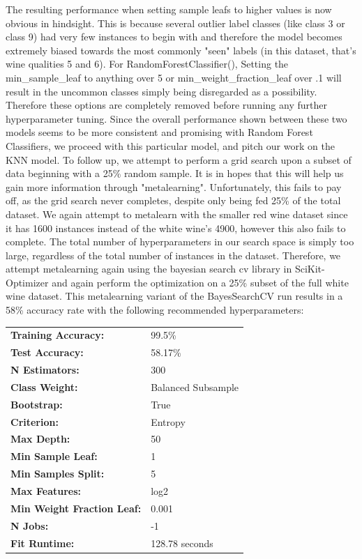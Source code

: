 \documentclass[titlepage]{article}
\begin{document}
The resulting performance when setting sample leafs to higher values is now obvious in hindsight.  This is because several outlier label classes (like class 3 or class 9) had very few instances to begin with and therefore the model becomes extremely biased towards the most commonly "seen" labels (in this dataset, that's wine qualities 5 and 6).  For RandomForestClassifier(), Setting the min\_sample\_leaf to anything over 5 or min\_weight\_fraction\_leaf over .1 will result in the uncommon classes simply being disregarded as a possibility.  Therefore these options are completely removed before running any further hyperparameter tuning.  Since the overall performance shown between these two models seems to be more consistent and promising with Random Forest Classifiers, we proceed with this particular model, and pitch our work on the KNN model.
\vspace{.2cm}\newline
To follow up, we attempt to perform a grid search upon a subset of data beginning with a 25\% random sample.  It is in hopes that this will help us gain more information through "metalearning".  Unfortunately, this fails to pay off, as the grid search never completes, despite only being fed 25\% of the total dataset.  We again attempt to metalearn with the smaller red wine dataset since it has 1600 instances instead of the white wine's 4900, however this also fails to complete.  The total number of hyperparameters in our search space is simply too large, regardless of the total number of instances in the dataset.  Therefore, we attempt metalearning again using the bayesian search cv library in SciKit-Optimizer \cite{skopt} and again perform the optimization on a 25\% subset of the full white wine dataset.  This metalearning variant of the BayesSearchCV run results in a 58\% accuracy rate with the following recommended hyperparameters:  
\vspace{.2cm}\newline
	\begin{tabular}{ l | l  }
	\textbf{Training Accuracy:} &99.5\% \\
	\textbf{Test Accuracy:} & 58.17\% \\
	\textbf{N Estimators:} &  300  \\
	\textbf{Class Weight:} & Balanced Subsample  \\
	\textbf{Bootstrap:} & True \\
	\textbf{Criterion:}  & Entropy  \\
	\textbf{Max Depth:} & 50\\
	\textbf{Min Sample Leaf:} & 1 \\
	\textbf{Min Samples Split:} & 5 \\
	\textbf{Max Features:} &  log2  \\
	\textbf{Min Weight Fraction Leaf:} &  0.001  \\
	\textbf{N Jobs: } & -1 \\
	\textbf{Fit Runtime:} &  128.78 seconds \\
\end{tabular}
\end{document}
